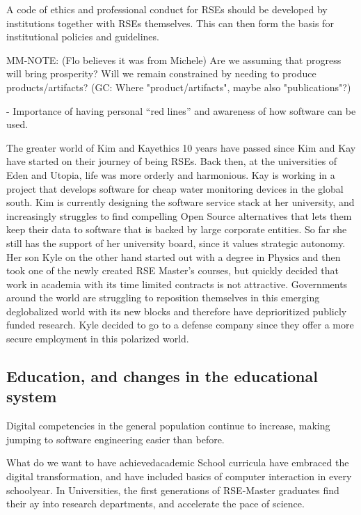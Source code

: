 \documentclass{eceasst}
\begin{document}
A code of ethics and professional conduct for RSEs should be developed by institutions together with RSEs themselves.
This can then form the basis for institutional policies and guidelines.

MM-NOTE: (Flo believes it was from Michele) Are we assuming that progress will bring prosperity? Will we remain constrained by needing to produce products/artifacts? (GC: Where "product/artifacts", maybe also "publications"?)

  - Importance of having personal “red lines” and awareness of how software can be used.

\begin{story}{The greater world of Kim and Kay}{ethics}
10 years have passed since Kim and Kay have started on their journey of being RSEs. Back then,
at the universities of Eden and Utopia, life was more orderly and harmonious. Kay is working in a project that develops
software for cheap water monitoring devices in the global south. Kim is currently designing the software service stack
at her university, and increasingly struggles to find compelling Open Source alternatives that lets them keep their data
to software that is backed by large corporate entities. So far she still has the support of her university board, since it values
strategic autonomy.
Her son Kyle on the other hand started out with a degree in Physics and then took one of the newly created RSE Master's courses,
but quickly decided that work in academia with its time limited contracts is not attractive.
Governments around the world are struggling to reposition themselves in this emerging deglobalized world with its new blocks
and therefore have deprioritized publicly funded research. Kyle decided to go to a defense company since they offer a
more secure employment in this polarized world.
\end{story}

\subsection{Education, and changes in the educational system}
Digital competencies in the general population continue to increase, making jumping to software engineering easier than before.

\begin{whatis}{What do we want to have achieved}{academic}
School curricula have embraced the digital transformation, and have included basics of computer interaction
in every schoolyear.
In Universities, the first generations of RSE-Master graduates find their ay into research departments,
and accelerate the pace of science.
\end{whatis}
\end{document}
